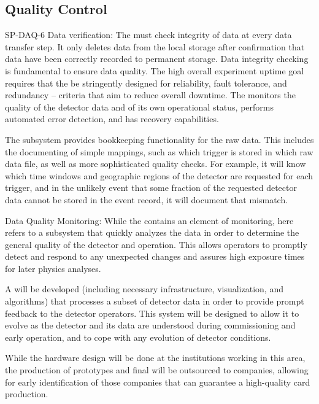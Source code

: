 \subsection{ Quality Control}

SP-DAQ-6 Data verification: The  must check integrity of data at
every data transfer step. It only deletes data from the local
storage after confirmation that data have been correctly recorded to
permanent storage. Data integrity checking is fundamental to ensure
data quality. The high overall experiment uptime goal requires that the  
be stringently designed for reliability, fault tolerance, and
redundancy  -- criteria that aim to reduce overall downtime. The 
monitors the quality of the detector data and of its own operational
status, performs automated error detection, and has recovery
capabilities.

The  subsystem provides bookkeeping
functionality for the raw data. This  includes the documenting of
simple mappings, such as which trigger is stored in which raw data
file, as well as more sophisticated quality checks. For example, it
will know which time windows and geographic regions of the detector
are requested for each trigger, and in the unlikely event that some
fraction of the requested detector data cannot be stored in the event
record, it will document that mismatch.

Data Quality Monitoring: While the  contains an element of
monitoring, here 
refers to a subsystem that quickly analyzes the data in order to
determine the general quality of the detector and  operation. This
 allows operators to promptly detect and respond to any
unexpected changes and assures high exposure times for later physics
analyses.

A   will be developed (including
necessary infrastructure, visualization, and algorithms) that 
processes a subset of detector data in order to provide prompt feedback
to the detector operators. This system will be designed to allow it to
evolve as the detector and its data are understood during
commissioning and early operation, and to cope with any evolution of
detector conditions.

While the hardware design will be done at the institutions working in
this area, the production of prototypes and final  will be
outsourced to companies, allowing for early identification of those
companies that can guarantee a high-quality card production.


